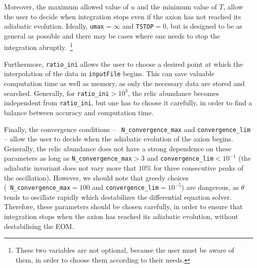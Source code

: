 \documentclass[11pt,a4paper]{article}
\begin{document}
Moreover,  the maximum allowed value of $u$ and the minimum value of $T$, allow the user to decide when  integration stops even if the axion has not reached its adiabatic evolution. Ideally, {\tt umax}$=\infty$ and {\tt TSTOP}$=0$, but \mimes is designed to be as general as possible and there may be cases where one needs to stop the integration abruptly.~\footnote{These two variables are not optional, because the user must be aware of them, in order to choose them according to their needs.}

Furthermore, {\tt ratio\_ini} allows the user to choose a desired point at which the interpolation of the data in {\tt inputFile} begins. This can save valuable computation time as well as memory, as only the necessary data are stored and searched. Generally, for {\tt ratio\_ini}$>10^{3}$, the relic abundance becomes
independent from  {\tt ratio\_ini}, but one has to choose it carefully, in order to find a balance between accuracy and computation time.

Finally, the convergence conditions -- \ie~{\tt N\_convergence\_max} and {\tt convergence\_lim} -- allow the user to decide when the adiabatic evolution of the axion begins. Generally, the relic abundance does not have a strong dependence on these parameters as long as {\tt N\_convergence\_max}$>3$ and {\tt convergence\_lim}$<10^{-1}$ (\ie the adiabatic invariant does not vary more that $10\%$ for three consecutive peaks of the oscillation). 
%
However, we should note that greedy choices (\eg~{\tt N\_convergence\_max}$=100$ and {\tt convergence\_lim}$=10^{-5}$) are dangerous, as $\theta$ tends to oscillate rapidly which  destabilizes the differential equation solver. Therefore, these parameters should be chosen carefully, in order to ensure that integration stops when the axion has reached its adiabatic evolution, without destabilising the EOM.
\end{document}
